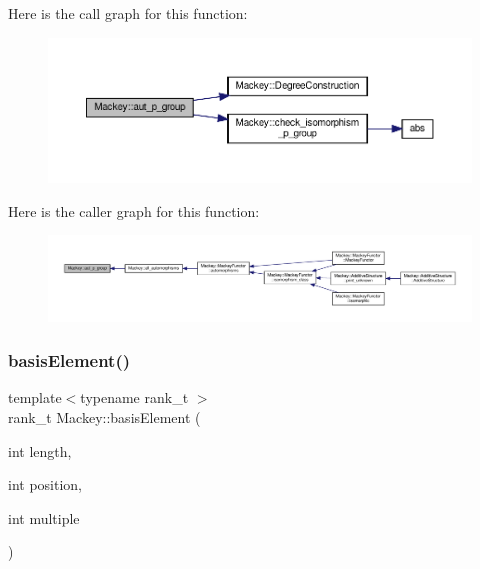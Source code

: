 Here is the call graph for this function\+:\nopagebreak
\begin{figure}[H]
\begin{center}
\leavevmode
\includegraphics[width=350pt]{namespaceMackey_a918f02198f6daadfd0c93109b63b2f1f_cgraph}
\end{center}
\end{figure}
Here is the caller graph for this function\+:\nopagebreak
\begin{figure}[H]
\begin{center}
\leavevmode
\includegraphics[width=350pt]{namespaceMackey_a918f02198f6daadfd0c93109b63b2f1f_icgraph}
\end{center}
\end{figure}
\mbox{\label{namespaceMackey_ac2e368bf7d802f2fc47e39a71a5a1630}} 
\subsubsection{\texorpdfstring{basis\+Element()}{basisElement()}\hspace{0.1cm}{\footnotesize\ttfamily [1/2]}}
{\footnotesize\ttfamily template$<$typename rank\+\_\+t $>$ \\
rank\+\_\+t Mackey\+::basis\+Element (\begin{DoxyParamCaption}\item[{int}]{length,  }\item[{int}]{position,  }\item[{int}]{multiple }\end{DoxyParamCaption})\hspace{0.3cm}{\ttfamily [inline]}}



